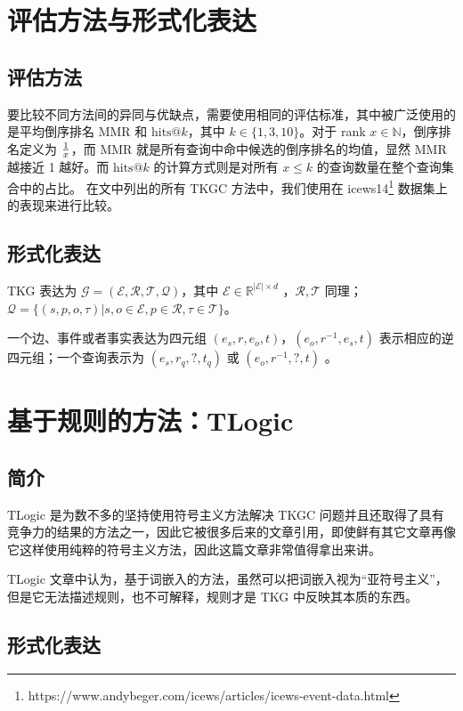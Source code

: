 \documentclass[a4paper, AutoFakeBold]{article}
\begin{document}
\section{评估方法与形式化表达}

\subsection{评估方法}

要比较不同方法间的异同与优缺点，需要使用相同的评估标准，其中被广泛使用的是平均倒序排名 MMR 和 $\text{hits}@k$，其中 $k\in\{1,3,10\}$。对于 rank $x\in{\mathbb N}$，倒序排名定义为 $1\over x$，而 MMR 就是所有查询中命中候选的倒序排名的均值，显然 MMR 越接近 1 越好。而 $\text{hits}@k$ 的计算方式则是对所有 $x\le k$ 的查询数量在整个查询集合中的占比。 在文中列出的所有 TKGC 方法中，我们使用在 icews14\footnote{https://www.andybeger.com/icews/articles/icews-event-data.html} 数据集上的表现来进行比较。

\subsection{形式化表达}

TKG 表达为 ${\mathcal G}=({\mathcal E},{\mathcal R},{\mathcal T},{\mathcal Q})$，其中 ${\mathcal E}\in{\mathbb R}^{|{\mathcal E}|\times d}$ ，${\mathcal R},{\mathcal T}$ 同理；${\mathcal Q}=\{(s,p,o,\tau)|s,o\in{\mathcal E},p\in{\mathcal R},\tau\in{\mathcal T}\}$。

一个边、事件或者事实表达为四元组 $(e_s,r,e_o,t)$，$(e_o,r^{-1},e_s,t)$ 表示相应的逆四元组；一个查询表示为 $(e_s,r_q,?,t_q)$ 或 $(e_o,r^{-1},?,t)$ 。


\section{基于规则的方法：TLogic}


\subsection{简介}

TLogic 是为数不多的坚持使用符号主义方法解决 TKGC 问题并且还取得了具有竞争力的结果的方法之一，因此它被很多后来的文章引用，即使鲜有其它文章再像它这样使用纯粹的符号主义方法，因此这篇文章非常值得拿出来讲。

TLogic 文章中认为，基于词嵌入的方法，虽然可以把词嵌入视为“亚符号主义”，但是它无法描述规则，也不可解释，规则才是 TKG 中反映其本质的东西。

\subsection{形式化表达}
\end{document}
